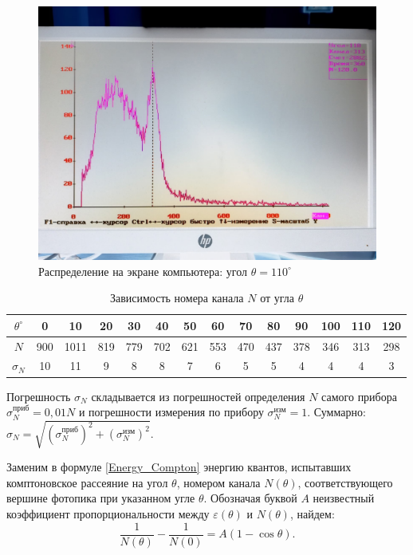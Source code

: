 \documentclass[12pt,a4paper]{article}
\begin{document}
	\begin{figure}[h!]
		\centering
		\includegraphics[width=\linewidth]{src/110Neg}
		\caption{Распределение на экране компьютера: угол $\theta = 110^\circ$}
	\end{figure}


 \begin{table}[h!]
		\centering
		\begin{tabular}{|c|c|c|c|c|c|c|c|c|c|c|c|c|c|}
			\hline
			$\theta^\circ$ & 0   & 10   & 20  & 30  & 40  & 50  & 60  & 70  & 80  & 90  & 100 & 110 & 120 \\ \hline
			$N$            & 900 & 1011 & 819 & 779 & 702 & 621 & 553 & 470 & 437 & 378 & 346 & 313 & 298 \\ \hline
			$\sigma_N$     & 10  & 11   & 9   & 8   & 8   & 7   & 6   & 5   & 5   & 4   & 4   & 4   & 3   \\ \hline
		\end{tabular}
		\caption{Зависимость номера канала $N$ от угла $\theta$}
		\label{Compton_Table}
	\end{table}

	Погрешность $\sigma_N$ складывается из погрешностей определения $N$ самого прибора $\sigma_N^\text{приб} = 0,01N$ и погрешности измерения по прибору $\sigma_N^\text{изм} = 1$. Суммарно: $\sigma_N = \sqrt{(\sigma_N^\text{приб})^2 + (\sigma_N^\text{изм})^2}$.
	
	
	Заменим в формуле \eqref{Energy_Compton} энергию квантов, испытавших комптоновское рассеяние на угол $\theta$, номером канала $N(\theta)$, соответствующего вершине фотопика при указанном угле $\theta$. Обозначая буквой $A$ неизвестный коэффициент пропорциональности между $\varepsilon(\theta)$ и $N(\theta)$, найдем:
	\begin{equation}
		\frac{1}{N(\theta)} - \frac{1}{N(0)} = A(1 - \cos\theta).
	\end{equation}
	
\end{document}

